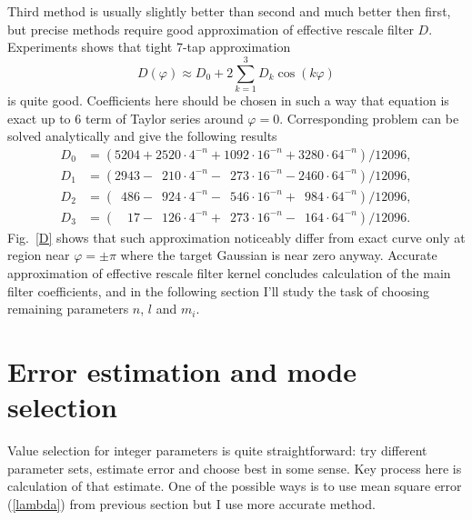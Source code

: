 \documentclass[10pt]{article}
\begin{document}
Third method is usually slightly better than second and much better then first, but precise methods
require good approximation of effective rescale filter $D$. Experiments shows that tight 7-tap
approximation
\begin{equation}
    D(\varphi) \approx D_0 + 2\sum_{k=1}^3 D_k\cos(k\varphi)
\end{equation}
is quite good. Coefficients here should be chosen in such a way that equation is exact up to 6
term of Taylor series around $\varphi = 0$. Corresponding problem can be solved analytically
and give the following results
\newcommand\0{\phantom{0}}
\begin{align}
    D_0 &= (   5204 +   2520\cdot4^{-n} +   1092\cdot16^{-n} +   3280\cdot64^{-n}) / 12096,\\
    D_1 &= (   2943 - \0 210\cdot4^{-n} - \0 273\cdot16^{-n} -   2460\cdot64^{-n}) / 12096,\\
    D_2 &= (\0  486 - \0 924\cdot4^{-n} - \0 546\cdot16^{-n} + \0 984\cdot64^{-n}) / 12096,\\
    D_3 &= (\0\0 17 - \0 126\cdot4^{-n} + \0 273\cdot16^{-n} - \0 164\cdot64^{-n}) / 12096.
\end{align}
Fig.~\ref{D} shows that such approximation noticeably differ from exact curve only at region near
$\varphi = \pm\pi$ where the target Gaussian is near zero anyway. Accurate approximation of
effective rescale filter kernel concludes calculation of the main filter coefficients, and in the
following section I'll study the task of choosing remaining parameters $n$, $l$ and $m_i$.


\section{Error estimation and mode selection}

Value selection for integer parameters is quite straightforward: try different parameter sets,
estimate error and choose best in some sense. Key process here is calculation of that estimate. One
of the possible ways is to use mean square error (\ref{lambda}) from previous section but I use
more accurate method.
\end{document}

